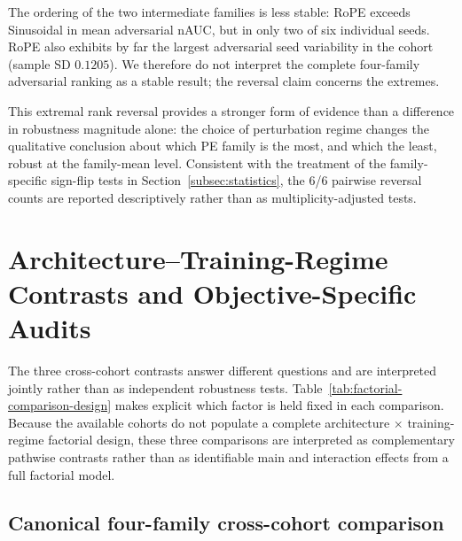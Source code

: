 \documentclass[preprint,12pt,authoryear]{elsarticle}
\begin{document}
The ordering of the two intermediate families is less stable: RoPE
exceeds Sinusoidal in mean adversarial nAUC, but in only two of six
individual seeds. RoPE also exhibits by far the largest adversarial
seed variability in the cohort (sample SD $0.1205$). We therefore do
not interpret the complete four-family adversarial ranking as a stable
result; the reversal claim concerns the extremes.

This extremal rank reversal provides a stronger form of evidence than a
difference in robustness magnitude alone: the choice of perturbation
regime changes the qualitative conclusion about which PE family is the
most, and which the least, robust at the family-mean level. Consistent
with the treatment of the family-specific sign-flip tests in
Section~\ref{subsec:statistics}, the 6/6 pairwise reversal counts are
reported descriptively rather than as multiplicity-adjusted tests.


\section{Architecture--Training-Regime Contrasts and Objective-Specific Audits}
\label{sec:cross-architecture-audits}

The three cross-cohort contrasts answer different questions and are
interpreted jointly rather than as independent robustness tests.
Table~\ref{tab:factorial-comparison-design} makes explicit which factor is
held fixed in each comparison. Because the available cohorts do not populate a
complete architecture $\times$ training-regime factorial design, these three
comparisons are interpreted as complementary pathwise contrasts rather than as
identifiable main and interaction effects from a full factorial model.



\subsection{Canonical four-family cross-cohort comparison}
\end{document}
